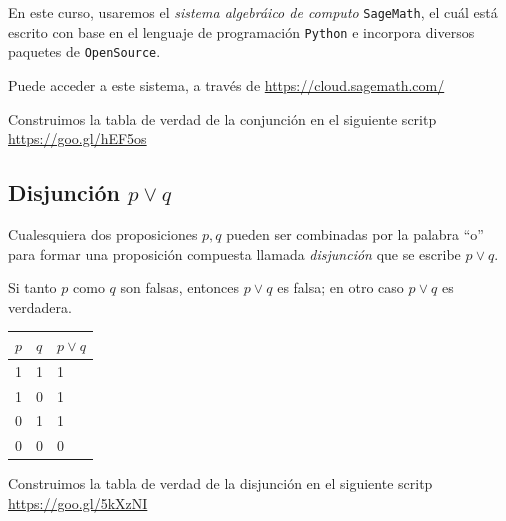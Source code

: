     En este curso, usaremos el \emph{sistema algebr\'aico de computo} \texttt{SageMath}, el cu\'al est\'a escrito con base en el lenguaje de programaci\'on \texttt{Python} e incorpora diversos paquetes de \texttt{OpenSource}.
    
    
    Puede acceder a este sistema, a trav\'es de \href{https://cloud.sagemath.com/}{https://cloud.sagemath.com/} 
    



    Construimos la tabla de verdad de la conjunci\'on en el siguiente scritp \href{https://cloud.sagemath.com/projects/12787063-cafe-4f3b-a2e0-905f8b83cf3b/files/MD01_TRDV01_AND.sagews}{https://goo.gl/hEF5os}
  
 


\subsection{Disjunci\'on $p \vee q$}


    Cualesquiera dos proposiciones $p,q$ pueden ser combinadas por la palabra ``o'' para formar una proposici\'on compuesta llamada \emph{disjunci\'on} que se escribe $p \vee q .$



    \begin{defn}
        Si tanto $p$ como $q$ son falsas, entonces $p \vee q$ es falsa; en otro caso $p\vee q$ es verdadera.
    \end{defn}
    




    \begin{tdv}[Disjunci\'on] \hfill
        \label{tdv:or}
        \begin{center}
            \begin{tabular}{|l|l|l|}\hline
                $p$ & $q$ & $p \vee q$\\\hline
                1 & 1 & 1\\\hline
                1 & 0 & 1\\\hline
                0 & 1 & 1\\\hline
                0 & 0 & 0\\\hline
            \end{tabular}
        \end{center}
        
    \end{tdv}
    
    Construimos la tabla de verdad de la disjunci\'on en el siguiente scritp \href{https://cloud.sagemath.com/projects/12787063-cafe-4f3b-a2e0-905f8b83cf3b/files/MD01_TDV02_OR.sagews}{https://goo.gl/5kXzNI}  

